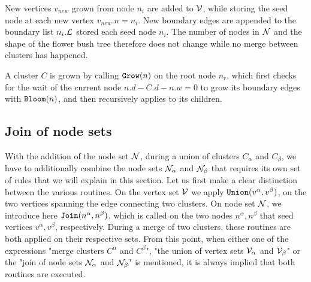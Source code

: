 New vertices $v_{new}$ grown from node $n_i$ are added to $\mathcal{V}$, while storing the seed node at each new vertex $v_{new}.n = n_i$. New boundary edges are appended to the boundary list $n_i.\mathcal{L}$ stored each seed node $n_i$. The number of nodes in $\mathcal{N}$ and the shape of the flower bush tree therefore does not change while no merge between clusters has happened.

\begin{theorem}\label{the:grownode}
  A cluster $C$ is grown by calling $\texttt{Grow}(n)$ on the root node $n_r$, which first checks for the wait of the current node $ n.d - C.d - n.w = 0$ to grow its boundary edges with $\texttt{Bloom}(n)$, and then recursively applies  to its children.
\end{theorem}

\begin{algo}[algotitle=Grow, label=al:bbgrow]
\begin{algorithm}[H]


\KwData{\node}

\BlankLine


\end{algorithm}
\end{algo}


\subsection{Join of node sets}\label{sec:jointnodesets}
With the addition of the node set $\mathcal{N}$, during a union of clusters $C_\alpha$ and $C_\beta$, we have to additionally combine the node sets $\mathcal{N}_{\alpha}$ and $\mathcal{N}_\beta$ that requires its own set of rules that we will explain in this section. Let us first make a clear distinction between the various routines. On the vertex set $\mathcal{V}$ we apply $\texttt{Union}(v^\alpha, v^\beta)$, on the two vertices spanning the edge connecting two clusters. On node set $\mathcal{N}$, we introduce here $\texttt{Join}(n^\alpha, n^\beta)$, which is called on the two nodes $n^\alpha, n^\beta$ that seed vertices $v^\alpha, v^\beta$, respectively. During a merge of two clusters, these routines are both applied on their respective sets. From this point, when either one of the expressions "merge clusters $C^\alpha$ and $C^\beta$", "the union of vertex sets $\mathcal{V}_\alpha$ and $\mathcal{V}_\beta$" or the "join of node sets $\mathcal{N}_{\alpha}$ and $\mathcal{N}_\beta$" is mentioned, it is always implied that both routines are executed.

